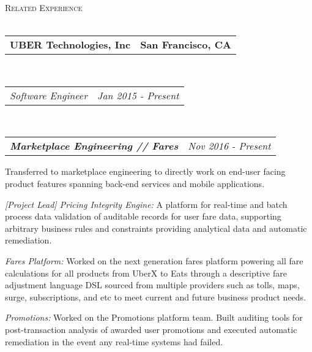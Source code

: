 \documentclass[10pt,letterpaper]{article}
\makeatletter
\newcommand{\area}[2]{\emph{#1:}   #2}
\newcommand{\lineunder}{\vspace*{-8pt} \\ \hspace*{-18pt} \hrulefill \\}
\newcommand{\header}[1]{{\hspace*{-15pt}\vspace*{6pt} \textsc{#1}} \vspace*{-6pt} \lineunder}
\newcommand{\subemployment}[3]{
	\headerrow
  {\hspace{8pt}\textbf{\emph{#1}}}
		{\emph{#2}}
  \vspace*{-15pt}
\begin{itemize*}
\item #3 
\end{itemize*}
}
\newcommand{\headerrow}[2]
{\begin{tabular*}{\linewidth}{l@{\extracolsep{\fill}}r}
	#1 &
	#2 \\
\end{tabular*}}
\newcommand{\employmentNoList}[5]{
	\headerrow
		{\textbf{#1}}
		{\textbf{#2}}
	\\
	\headerrow
		{\emph{#3}}
		{\emph{#4}}
	#5
}
\makeatother
\begin{document}
\header{Related Experience}
\employmentNoList{UBER Technologies, Inc}{San Francisco, CA}{Software Engineer}{Jan 2015 - Present}{
  \\
 \subemployment{Marketplace Engineering // Fares}{Nov 2016 - Present}{
 Transferred to marketplace engineering to directly work on end-user facing
 product features spanning back-end services and mobile applications. 
\item \area{[Project Lead] Pricing Integrity Engine}{A platform for real-time
    and batch process data validation of auditable records for user fare data, supporting
    arbitrary business rules and constraints providing analytical data and
    automatic remediation.}
\item \area{Fares Platform}{Worked on the next generation fares platform
    powering all fare calculations for all products from UberX to Eats through
    a descriptive fare adjustment language DSL sourced from multiple providers
    such as tolls, maps, surge, subscriptions, and etc to meet current and future
    business product needs.}
\item \area{Promotions}{Worked on the Promotions platform team. Built auditing
    tools for post-transaction analysis of awarded user promotions and executed
    automatic remediation in the event any real-time systems had failed.}
}

}
\end{document}

